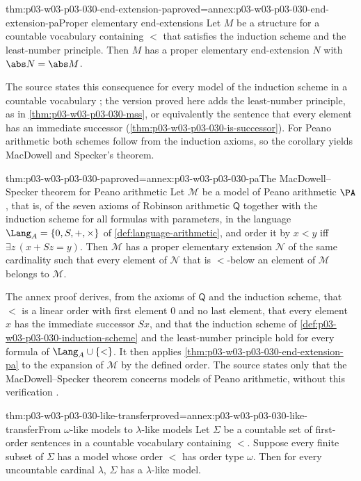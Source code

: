 \begin{hbcorollary}{thm:p03-w03-p03-030-end-extension-pa}{proved=annex:p03-w03-p03-030-end-extension-pa}{Proper elementary end-extensions}
Let \(M\) be a structure for a countable vocabulary containing \(<\) that
satisfies the induction scheme and the least-number principle.  Then \(M\)
has a proper elementary end-extension \(N\) with \(\abs N=\abs M\).
\end{hbcorollary}

The source states this consequence for every model of the induction scheme
in a countable vocabulary \cite[p.~207]{Schmerl1985TransferTheorems}; the
version proved here adds the least-number principle, as in
\cref{thm:p03-w03-p03-030-mss}, or equivalently the sentence that every
element has an immediate successor
(\cref{thm:p03-w03-p03-030-is-successor}).  For Peano arithmetic both schemes
follow from the induction axioms, so the corollary yields MacDowell and Specker's
theorem.

\begin{hbcorollary}{thm:p03-w03-p03-030-pa}{proved=annex:p03-w03-p03-030-pa}{The MacDowell--Specker theorem for Peano arithmetic}
Let \(\mathcal M\) be a model of Peano arithmetic \(\PA\), that is, of the
seven axioms of Robinson arithmetic \(\mathsf Q\) together with the
induction scheme for all formulas with parameters, in the language
\(\Lang_A=\{0,S,+,\times\}\) of \cref{def:language-arithmetic}, and order
it by \(x<y\) iff \(\exists z\,(x+Sz=y)\).  Then \(\mathcal M\) has a proper
elementary extension \(\mathcal N\) of the same cardinality such that every
element of \(\mathcal N\) that is \(<\)-below an element of \(\mathcal M\)
belongs to \(\mathcal M\).
\end{hbcorollary}

The annex proof derives, from the axioms of \(\mathsf Q\) and the induction
scheme, that \(<\) is a linear order with first element \(0\) and no last
element, that every element \(x\) has the immediate successor \(Sx\), and
that the induction scheme of \cref{def:p03-w03-p03-030-induction-scheme} and
the least-number principle hold for every formula of \(\Lang_A\cup\{<\}\).
It then applies \cref{thm:p03-w03-p03-030-end-extension-pa} to the expansion
of \(\mathcal M\) by the defined order.  The source states only that the
MacDowell--Specker theorem concerns models of Peano arithmetic, without this
verification \cite[p.~206]{Schmerl1985TransferTheorems}.

\begin{hbcorollary}{thm:p03-w03-p03-030-like-transfer}{proved=annex:p03-w03-p03-030-like-transfer}{From \(\omega\)-like models to \(\lambda\)-like models}
Let \(\Sigma\) be a countable set of first-order sentences in a countable
vocabulary containing \(<\).  Suppose every finite subset of \(\Sigma\) has
a model whose order \(<\) has order type \(\omega\).  Then for every
uncountable cardinal \(\lambda\), \(\Sigma\) has a \(\lambda\)-like model.
\end{hbcorollary}

